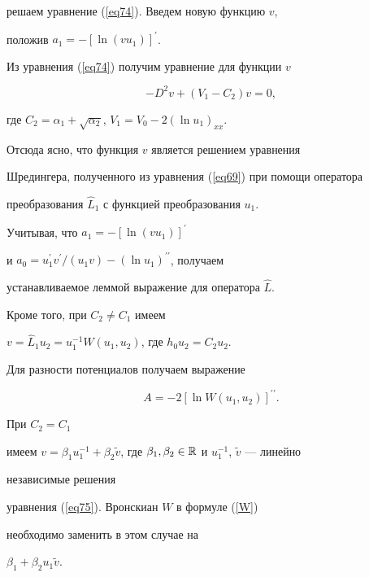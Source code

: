 \begin{pf}
решаем уравнение (\ref{eq74}). Введем новую функцию $v$,


положив $a_1=-[\ln (vu_1)]^{\prime }$.


Из уравнения (\ref{eq74}) получим уравнение для функции $v$


\begin{equation}


-D^2v+(V_1-C_2)v=0,


\label{eq75}


\end{equation}


где $C_2=\alpha _1+\sqrt{\alpha _2}$, $V_1=V_0-2(\ln


u_1)_{xx}$.


Отсюда ясно, что функция $v$ является решением уравнения


Шредингера, полученного из уравнения (\ref{eq69}) при помощи оператора


преобразования $\widehat{L}_1$ с функцией преобразования $u_1$.


Учитывая, что $a_1=-[\ln (vu_1)]^{\prime }$


и $a_0=u_1^{\prime }v^{\prime }/(u_1v)-(\ln u_1)^{\prime \prime}$, получаем


устанавливаемое леммой выражение для оператора $\widehat {L}$.


Кроме того, при $C_2\ne C_1$ имеем


$v=\widehat{L}_1u_2=u_1^{-1}W(u_1,u_2)$, где $h_0u_2=C_2u_2$.


Для разности потенциалов получаем выражение


\begin{equation}


A=-2[\ln W(u_1,u_2)]^{\prime \prime }.


\label{W}


\end{equation}


При $C_2=C_1$


имеем $v=\beta _1u_1^{-1}+\beta _2\widetilde v$, где $\beta_1, \beta _2


\in {\Bbb R}$ и $u_1^{-1}$, $\widetilde v$ --- линейно


независимые  решения


уравнения (\ref{eq75}). Вронскиан $W$ в формуле (\ref{W})


необходимо заменить в этом случае на


$\beta _1+\beta _2u_1\widetilde v$.


\end{pf}






